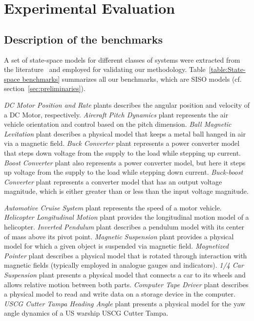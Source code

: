 \documentclass[runningheads,a4paper]{llncs}
\begin{document}
\section{Experimental Evaluation}


\subsection{Description of the benchmarks}
\label{experimental-setup}

A set of state-space models for different classes of 
systems were extracted from the 
literature~\cite{Franklin15,maglev,converters,CTMS} 
and employed for validating our methodology. 
%
%
Table~\ref{table:State-space benchmarks} summarizes 
all our benchmarks, which are SISO models (cf. section~\ref{sec:preliminaries}). 

\textit{DC Motor Position and Rate} plants describes the angular position and 
velocity of a DC Motor, respectively. 
\textit{Aircraft Pitch Dynamics} plant represents the air vehicle orientation and 
control based on the pitch dimension. 
\textit{Ball Magnetic Levitation} plant describes a physical model that keeps a 
metal ball hanged in air via a magnetic field. 
\textit{Buck Converter} plant represents a power converter model that steps down 
voltage from the supply to the load while stepping up current. 
\textit{Boost Converter} plant also represents a power converter model, but here 
it steps up voltage from the supply to the load while stepping down current. 
\textit{Buck-boost Converter} plant represents a converter model that has an output 
voltage magnitude, which is either greater than or less than the input voltage magnitude. 

\textit{Automotive Cruise System} plant represents the speed of a motor vehicle. 
\textit{Helicopter Longitudinal Motion} plant provides the longitudinal motion model 
of a helicopter. 
\textit{Inverted Pendulum} plant describes a pendulum model
with its center of mass above its pivot point. 
\textit{Magnetic Suspension} plant provides a physical model for which 
a given object is suspended via magnetic field. 
\textit{Magnetized Pointer} plant describes a physical model that is rotated through interaction 
with magnetic fields (typically employed in analogue gauges and indicators).
\textit{1/4 Car Suspension} plant presents a physical model that connects a car to its wheels 
and allows relative motion between both parts.
\textit{Computer Tape Driver} plant describes a physical model to read and write data 
on a storage device in the computer.
\textit{USCG Cutter Tampa Heading Angle} plant presents a physical model 
for the yaw angle dynamics of a US warship USCG Cutter Tampa.
\end{document}
